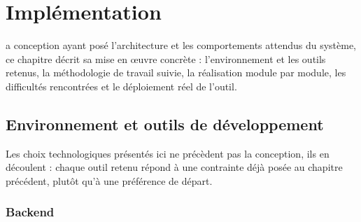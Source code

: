 \chapter{Implémentation}
\label{chap:realisation}

a conception ayant posé l'architecture et les
comportements attendus du système, ce chapitre décrit sa mise en œuvre
concrète : l'environnement et les outils retenus, la méthodologie de
travail suivie, la réalisation module par module, les difficultés
rencontrées et le déploiement réel de l'outil.
\minisommaire

\section{Environnement et outils de développement}

Les choix technologiques présentés ici ne précèdent pas la conception,
ils en découlent : chaque outil retenu répond à une contrainte déjà
posée au chapitre précédent, plutôt qu'à une préférence de départ.

\subsection{Backend}

